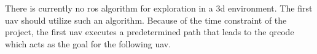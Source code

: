 
There is currently no \acs{ros} algorithm for exploration in a \acs{3d} environment. The first \acs{uav} should utilize such an algorithm. Because of the time constraint of the project, the first \acs{uav} executes a predetermined path that leads to the \acs{qrcode} which acts as the goal for the following \acs{uav}.